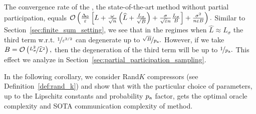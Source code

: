 \documentclass{article}
\newcommand{\alexander}[1]{\todo[inline]{\textbf{Alexander: }#1}}
\newcommand{\algorithmname}{DASHA-PP}
\newcommand*{\probavailable}{\ensuremath{p_{\textnormal{a}}}}
\begin{document}
The convergence rate of the , the state-of-the-art method without partial participation, equals $\mathcal{O}\left(\frac{\Delta_0}{\varepsilon}\left[L + \frac{\omega}{\sqrt{n}}\left(\widehat{L} + \frac{L_{\sigma}}{\sqrt{B}}\right) + \frac{\sigma}{\sqrt{\varepsilon} n}\frac{L_\sigma}{B}\right] + \frac{\sigma^2}{n \varepsilon B}\right).$ Similar to Section~\ref{sec:finite_sum_setting}, we see that in the regimes when $\widehat{L} \approx L_{\sigma}$ the third term w.r.t. $\nicefrac{1}{\varepsilon^{3/2}}$ can degenerate up to $\nicefrac{\sqrt{B}}{\probavailable}.$ However, if we take $B = \mathcal{O}\left(\nicefrac{L_{\sigma}^2}{\widehat{L}^2}\right),$ then the degeneration of the third term will be up to $\nicefrac{1}{\probavailable}.$ This effect we analyze in Section~\ref{sec:partial_participation_sampling}.


In the following corollary, we consider Rand$K$ compressors (see Definition~\ref{def:rand_k}) and show that with the particular choice of parameters, up to the Lipschitz constants and probability $\probavailable$ factor, \algname{\algorithmname-MVR} gets the optimal oracle complexity and SOTA communication complexity of  method.
\end{document}
